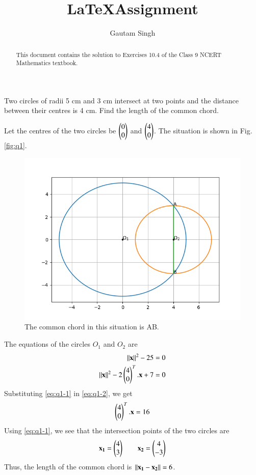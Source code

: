 \documentclass[journal,12pt,twocolumn]{IEEEtran}
\let\vec\mathbf
\begin{document}
\vspace{3cm}
\title{\LaTeX Assignment}
\author{Gautam Singh}
\maketitle
\bigskip
\begin{abstract}
This document contains the solution to Exercises 10.4 of the Class 9 NCERT
Mathematics textbook.
\end{abstract}

\problem Two circles of radii 5 cm and 3 cm intersect at two points and the
distance between their centres is 4 cm. Find the length of the common chord.

\solution Let the centres of the two circles be $\begin{pmatrix}0\\0\end{pmatrix}$ and 
$\begin{pmatrix}4\\0\end{pmatrix}$. The situation is shown in Fig. \eqref{fig:q1}.

\begin{figure}[!ht]
    \centering
    \includegraphics[width=\columnwidth]{figs/10_4_1.png}
    \caption{The common chord in this situation is AB.}
    \label{fig:q1}
\end{figure}

The equations of the circles $O_1$ and $O_2$ are
\begin{align}
    \norm{\vec{x}}^2 - 25 &= 0 \label{eq:q1-1} \\
    \norm{\vec{x}}^2 - 2\myvec{4\\0}^T.\vec{x} + 7 &= 0 \label{eq:q1-2} \\
\end{align}
Substituting \eqref{eq:q1-1} in \eqref{eq:q1-2}, we get
\begin{align}
    \myvec{4\\0}^T.\vec{x} &= 16 \\
    \label{eq:q1-3}
\end{align}
Using \eqref{eq:q1-1}, we see that the intersection points
of the two circles are
\begin{align}
    \vec{x_1} = \myvec{4\\3} \qquad \vec{x_2} = \myvec{4\\-3}
    \label{eq:q1-4}
\end{align}
Thus, the length of the common chord is $\norm{\vec{x_1} - \vec{x_2}} = 6$.
\end{document}
